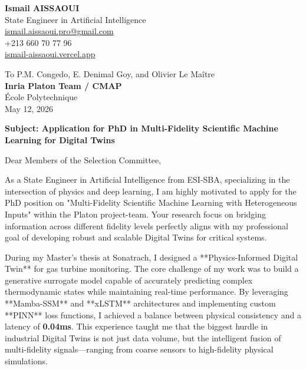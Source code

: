\documentclass[a4paper,11pt]{article}
\begin{document}
\begin{flushleft}
    \textbf{Ismail AISSAOUI} \\
    State Engineer in Artificial Intelligence \\
    \href{mailto:ismail.aissaoui.pro@gmail.com}{ismail.aissaoui.pro@gmail.com} \\
    +213 660 70 77 96 \\
    \href{https://ismail-aissaoui.vercel.app}{ismail-aissaoui.vercel.app}
\end{flushleft}

\begin{flushright}
    To P.M. Congedo, E. Denimal Goy, and Olivier Le Maître \\
    \textbf{Inria Platon Team / CMAP} \\
    École Polytechnique \\
    \medskip
    May 12, 2026
\end{flushright}

\bigskip

\noindent \textbf{Subject: Application for PhD in Multi-Fidelity Scientific Machine Learning for Digital Twins}

\bigskip

Dear Members of the Selection Committee,

As a State Engineer in Artificial Intelligence from ESI-SBA, specializing in the intersection of physics and deep learning, I am highly motivated to apply for the PhD position on "Multi-Fidelity Scientific Machine Learning with Heterogeneous Inputs" within the Platon project-team. Your research focus on bridging information across different fidelity levels perfectly aligns with my professional goal of developing robust and scalable Digital Twins for critical systems.

During my Master’s thesis at Sonatrach, I designed a **Physics-Informed Digital Twin** for gas turbine monitoring. The core challenge of my work was to build a generative surrogate model capable of accurately predicting complex thermodynamic states while maintaining real-time performance. By leveraging **Mamba-SSM** and **xLSTM** architectures and implementing custom **PINN** loss functions, I achieved a balance between physical consistency and a latency of \textbf{0.04ms}. This experience taught me that the biggest hurdle in industrial Digital Twins is not just data volume, but the intelligent fusion of multi-fidelity signals—ranging from coarse sensors to high-fidelity physical simulations.
\end{document}
